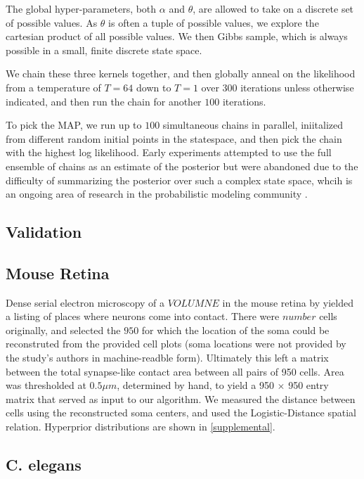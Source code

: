 \documentclass{nature}
\begin{document}
The global hyper-parameters, both $\alpha$ and $\theta$, are allowed
to take on a discrete set of possible values. As $\theta$ is often a
tuple of possible values, we explore the cartesian product of all
possible values. We then Gibbs sample, which is always possible in a 
small, finite discrete state space. 

We chain these three kernels together, and then globally
anneal on the likelihood from a temperature of $T=64$ down to 
$T=1$ over 300 iterations unless otherwise indicated, and
then run the chain for another $100$ iterations. 

To pick the MAP, we run up to $100$ simultaneous chains in parallel,
iniitalized from different random initial points in the statespace,
and then pick the chain with the highest log likelihood. Early
experiments attempted to use the full ensemble of chains as an
estimate of the posterior but were abandoned due to the difficulty of
summarizing the posterior over such a complex state space, whcih is an
ongoing area of research in the probabilistic modeling community
\autocite{}.


\subsection{Validation}


\subsection {Mouse Retina}
Dense serial electron microscopy of a $VOLUMNE$ in the mouse retina by
\autocite{Helmstaedter2013} yielded a listing of places where neurons
come into contact. There were $number$ cells originally, and selected
the $950$ for which the location of the soma could be reconstruted
from the provided cell plots (soma locations were not provided by the
study's authors in machine-readble form). Ultimately
this left a matrix between the total synapse-like contact area between
all pairs of 950 cells. Area was thresholded at $0.5\mu m$, determined
by hand, to yield a 950 $\times$ 950 entry matrix that served as input
to our algorithm. We measured the distance between cells using
the reconstructed soma centers, and used the Logistic-Distance
spatial relation. Hyperprior distributions are shown in \ref{supplemental}. 

\subsection{C. elegans}
\end{document}
